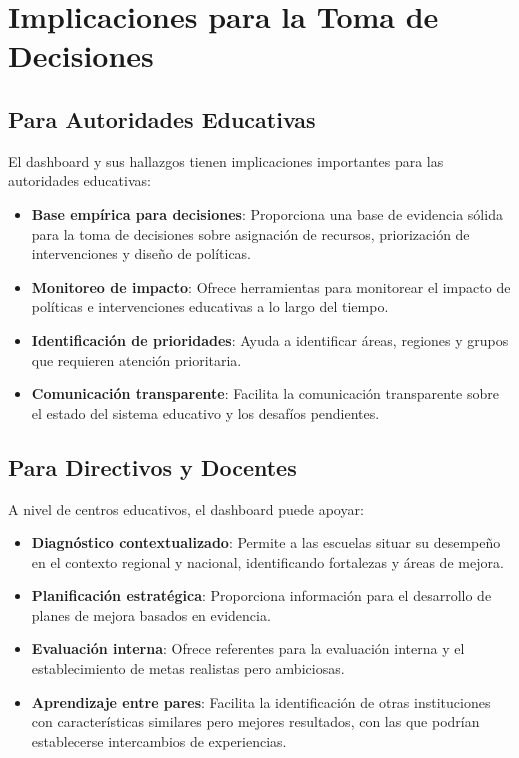 \section{Implicaciones para la Toma de Decisiones}

\subsection{Para Autoridades Educativas}
El dashboard y sus hallazgos tienen implicaciones importantes para las autoridades educativas:

\begin{itemize}
    \item \textbf{Base empírica para decisiones}: Proporciona una base de evidencia sólida para la toma de decisiones sobre asignación de recursos, priorización de intervenciones y diseño de políticas.
    
    \item \textbf{Monitoreo de impacto}: Ofrece herramientas para monitorear el impacto de políticas e intervenciones educativas a lo largo del tiempo.
    
    \item \textbf{Identificación de prioridades}: Ayuda a identificar áreas, regiones y grupos que requieren atención prioritaria.
    
    \item \textbf{Comunicación transparente}: Facilita la comunicación transparente sobre el estado del sistema educativo y los desafíos pendientes.
\end{itemize}

\subsection{Para Directivos y Docentes}
A nivel de centros educativos, el dashboard puede apoyar:

\begin{itemize}
    \item \textbf{Diagnóstico contextualizado}: Permite a las escuelas situar su desempeño en el contexto regional y nacional, identificando fortalezas y áreas de mejora.
    
    \item \textbf{Planificación estratégica}: Proporciona información para el desarrollo de planes de mejora basados en evidencia.
    
    \item \textbf{Evaluación interna}: Ofrece referentes para la evaluación interna y el establecimiento de metas realistas pero ambiciosas.
    
    \item \textbf{Aprendizaje entre pares}: Facilita la identificación de otras instituciones con características similares pero mejores resultados, con las que podrían establecerse intercambios de experiencias.
\end{itemize}

